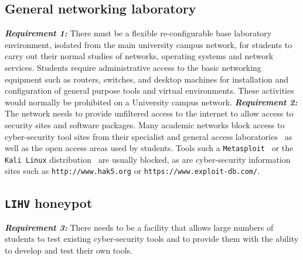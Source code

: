\subsection{General networking laboratory}\label{subsec:GeneralLab}
\noindent \emph{\textbf{Requirement 1:}} There must be a flexible re-configurable base laboratory environment, isolated from the main university campus network, for students to carry out their normal studies of networks, operating systems and network services. Students require administrative access to the basic networking equipment such as routers, switches, and desktop machines for installation and configuration of general purpose tools and virtual environments. These activities would normally be prohibited on a University campus network.
\newline\newline
\noindent \emph{\textbf{Requirement 2:}} The network needs to provide unfiltered access to the internet to allow access to security sites and software packages. Many academic networks block access to cyber-security tool sites from their specialist and general access laboratories~\cite{ACGO:06,YYLCHJ:04} as well as the open access areas used by students. Tools such a \texttt{Metasploit}~\cite{R7:17} or the \texttt{Kali Linux} distribution~\cite{OS:17} are usually blocked, as are cyber-security information sites such as \texttt{http://www.hak5.org} or \texttt{https://www.exploit-db.com/}.

\subsection{\texttt{LIHV} honeypot}\label{subsec:LabHoneypot}
\noindent \emph{\textbf{Requirement 3:}} There needs to be a facility that allows large numbers of students to test existing cyber-security tools and to provide them with the ability to develop and test their own tools. 

